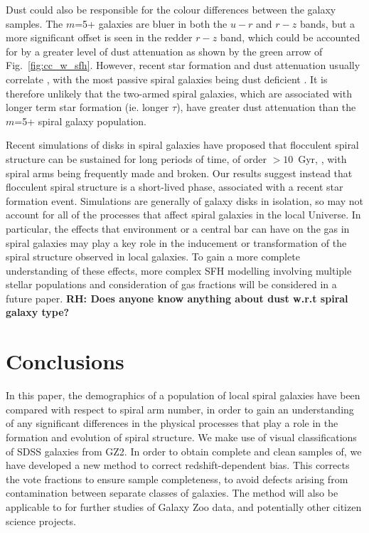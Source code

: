 \documentclass[useAMS,usenatbib]{mn2e}
\newcommand{\rh}[1]{{\bf \textcolor{RoyalPurple}{RH: #1}}}
\begin{document}
Dust could also be responsible for the colour differences between the galaxy samples. The $m$=5+ galaxies are bluer in both the $u-r$ and $r-z$ bands, but a more significant offset is seen in the redder $r-z$ band, which could be accounted for by a greater level of dust attenuation as shown by the green arrow of Fig.~\ref{fig:cc_w_sfh}. However, recent star formation and dust attenuation usually correlate \citep{Garn_10}, with the most passive spiral galaxies being dust deficient \citep{Rowlands_12}. It is therefore unlikely that the two-armed spiral galaxies, which are associated with longer term star formation (ie. longer $\tau$), have greater dust attenuation than the $m$=5+ spiral galaxy population. 

Recent simulations of disks in spiral galaxies have proposed that flocculent spiral structure can be sustained for long periods of time, of order $>10$~Gyr, \citep{Fujii_11,Donghia_13}, with spiral arms being frequently made and broken. Our results suggest instead that flocculent spiral structure is a short-lived phase, associated with a recent star formation event. Simulations are generally of galaxy disks in isolation, so may not account for all of the processes that affect spiral galaxies in the local Universe. In particular, the effects that environment or a central bar can have on the gas in spiral galaxies may play a key role in the inducement or transformation of the spiral structure observed in local galaxies. To gain a more complete understanding of these effects, more complex SFH modelling involving multiple stellar populations and consideration of gas fractions will be considered in a future paper. \rh{Does anyone know anything about dust w.r.t spiral galaxy type?} %
\section{Conclusions}
\label{sec:conclusions}

In this paper, the demographics of a population of local spiral galaxies have been compared with respect to spiral arm number, in order to gain an understanding of any significant differences in the physical processes that play a role in the formation and evolution of spiral structure. We make use of visual classifications of SDSS galaxies from GZ2. In order to obtain complete and clean samples of, we have developed a new method to correct redshift-dependent bias. This corrects the vote fractions to ensure sample completeness, to avoid defects arising from contamination between separate classes of galaxies. The method will also be applicable to for further studies of Galaxy Zoo data, and potentially other citizen science projects.
\end{document}
